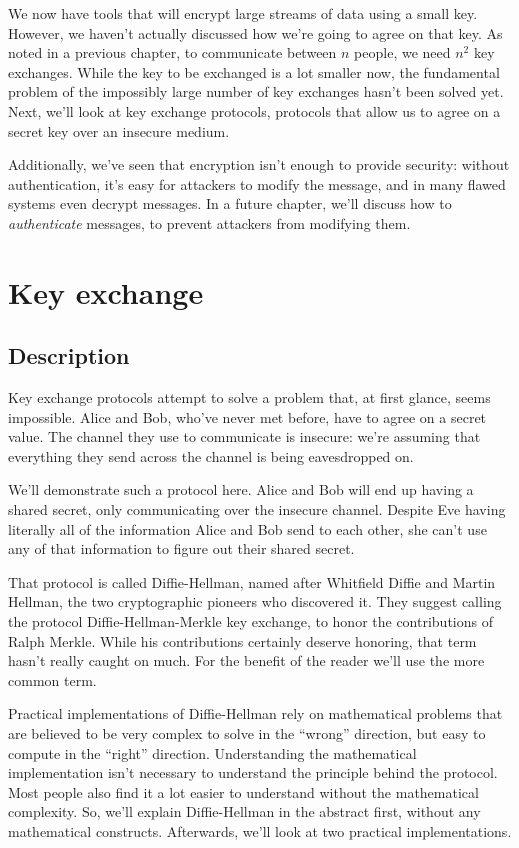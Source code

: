 \documentclass[11pt,ebook,table,dvipsnames]{memoir}
\begin{document}
We now have tools that will encrypt large streams of data using a
small key. However, we haven't actually discussed how we're going to
agree on that key. As noted in a previous chapter, to communicate
between $n$ people, we need $n^2$ key exchanges. While the key to be
exchanged is a lot smaller now, the fundamental problem of the
impossibly large number of key exchanges hasn't been solved yet. Next,
we'll look at key exchange protocols, protocols that allow us to
agree on a secret key over an insecure medium.

Additionally, we've seen that encryption isn't enough to provide
security: without authentication, it's easy for attackers to modify
the message, and in many flawed systems even decrypt messages. In a
future chapter, we'll discuss how to \emph{authenticate} messages, to
prevent attackers from modifying them.
\chapter{Key exchange}
\label{sec-2-4}
\section{Description}
\label{sec-2-4-1}

Key exchange protocols attempt to solve a problem that, at first
glance, seems impossible. Alice and Bob, who've never met before, have
to agree on a secret value. The channel they use to communicate is
insecure: we're assuming that everything they send across the channel
is being eavesdropped on.

We'll demonstrate such a protocol here. Alice and Bob will end up
having a shared secret, only communicating over the insecure channel.
Despite Eve having literally all of the information Alice and Bob send
to each other, she can't use any of that information to figure out
their shared secret.

That protocol is called Diffie-Hellman, named after Whitfield Diffie
and Martin Hellman, the two cryptographic pioneers who discovered it.
They suggest calling the protocol Diffie-Hellman-Merkle key exchange,
to honor the contributions of Ralph Merkle. While his contributions
certainly deserve honoring, that term hasn't really caught on much.
For the benefit of the reader we'll use the more common term.

Practical implementations of Diffie-Hellman rely on mathematical
problems that are believed to be very complex to solve in the \enquote{wrong}
direction, but easy to compute in the \enquote{right} direction. Understanding
the mathematical implementation isn't necessary to understand the
principle behind the protocol. Most people also find it a lot easier
to understand without the mathematical complexity. So, we'll explain
Diffie-Hellman in the abstract first, without any mathematical
constructs. Afterwards, we'll look at two practical implementations.
\end{document}
